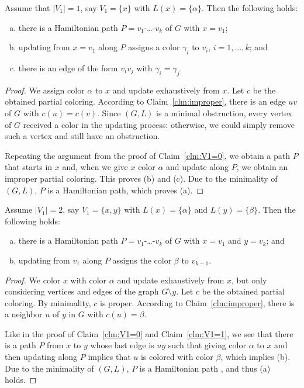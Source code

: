 \documentclass[11pt]{article}
\begin{document}
\begin{claim}\label{clm:V1=1}
Assume that $|V_1|=1$, say $V_1=\{x\}$ with $L(x)=\{\alpha\}$.
Then the following holds:
	\begin{enumerate}[(a)]
		\item there is a Hamiltonian path $P=v_1$-\ldots-$v_k$ of $G$ with $x=v_1$;
		\item updating from $x=v_1$ along $P$ assigns a color $\gamma_i$ to $v_i$, $i=1,\ldots,k$; and
		\item there is an edge of the form $v_iv_j$ with $\gamma_i=\gamma_j$.
	\end{enumerate}
\end{claim}
\begin{proof}
We assign color $\alpha$ to $x$ and update exhaustively from $x$.
Let $c$ be the obtained partial coloring.
According to Claim~\ref{clm:improper}, there is an edge $uv$ of $G$ with $c(u)=c(v)$.
Since $(G,L)$ is a minimal obstruction, every vertex of $G$ received a color in the updating process: otherwise, we could simply remove such a vertex and still have an obstruction.

Repeating the argument from the proof of Claim~\ref{clm:V1=0}, we obtain a path $P$ that starts in $x$ and, when we give $x$ color $\alpha$ and update along $P$, we obtain an improper partial coloring.
This proves (b) and (c).
Due to the minimality of $(G,L)$, $P$ is a Hamiltonian path, which proves (a).
\end{proof}

\begin{claim}\label{clm:V1=2}
Assume $|V_1|=2$, say $V_1=\{x,y\}$ with $L(x)=\{\alpha\}$ and $L(y)=\{\beta\}$.
Then the following holds:
\begin{enumerate}[(a)]
	\item there is a Hamiltonian path $P=v_1$-\ldots-$v_k$ of $G$ with $x=v_1$ and $y=v_k$; and
	\item updating from $v_1$ along $P$ assigns the color $\beta$ to $v_{k-1}$.
\end{enumerate}
\end{claim}
\begin{proof}
We color $x$ with color $\alpha$ and update exhaustively from $x$, but only considering vertices and edges of the graph $G\setminus y$.
Let $c$ be the obtained partial coloring.
By minimality, $c$ is proper.
According to Claim~\ref{clm:improper}, there is a neighbor $u$ of $y$ in $G$ with $c(u)=\beta$.

Like in the proof of Claim~\ref{clm:V1=0} and Claim~\ref{clm:V1=1}, we see that there is a path $P$ from $x$ to $y$ whose last edge is $uy$ such that giving color $\alpha$ to $x$ and then updating along $P$ implies that $u$ is colored with color $\beta$, which implies (b).
Due to the minimality of $(G,L)$, $P$ is a Hamiltonian path , and thus (a) holds.
\end{proof}
\end{document}
